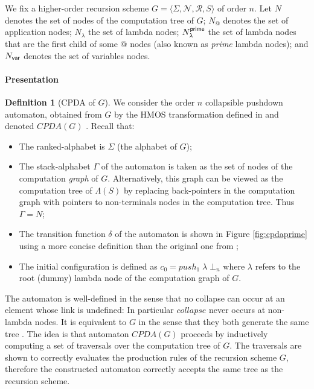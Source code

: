 \documentclass[a4paper]{article}[12pt]
\theoremstyle{remark}
\theoremstyle{definition}
\newtheorem{definition}{Definition}[section]
\newcommand\Nodes{N}%
\begin{document}
We fix a higher-order recursion scheme $G = \langle \Sigma, \mathcal{N}, \mathcal{R}, S \rangle$ of order $n$. Let $\Nodes$ denotes the set of nodes of the computation tree of $G$; $\Nodes_@$ denotes the set of application nodes; $\Nodes_\lambda$ the set of lambda nodes; $\Nodes_\lambda^{\sf prime}$ the set of lambda nodes that are the first child of some $@$ nodes (also known as \emph{prime} lambda nodes); and $\Nodes_{\sf var}$ denotes the set of variables nodes.

\paragraph{Presentation}

\begin{definition}[CPDA of $G$]
We consider the order $n$ collapsible pushdown automaton, obtained from $G$ by the HMOS transformation defined in \cite{hmos-lics08} and denoted $CPDA(G)$ \cite[Definition 5.2]{hague-collaps-full}. Recall that:
\begin{itemize}
	\item The ranked-alphabet is $\Sigma$ (the alphabet of $G$);
	\item The stack-alphabet $\Gamma$ of the automaton is taken as the set of nodes of the computation \emph{graph} of $G$. Alternatively, this graph can be viewed as the computation tree of $\Lambda(S)$ by replacing back-pointers in the computation graph with pointers to non-terminals nodes in the computation tree. Thus $\Gamma = \Nodes$;
	\item The transition function $\delta$ of the automaton is shown in Figure \ref{fig:cpdaprime} using a more concise definition than the original one
	from \cite{hague-collaps-full};
	\item The initial configuration is defined as $c_0 = push_1\; \lambda\; \bot_n$
	where $\lambda$ refers to the root (dummy) lambda node of the computation graph of $G$.	
\end{itemize} 
\end{definition}
The automaton is well-defined in the sense that no collapse can occur at an element whose link is undefined: In particular $collapse$ never occurs at non-lambda nodes. It is equivalent to $G$ in the sense that they both generate the same tree \cite{hmos-lics08}.
The idea is that automaton $CPDA(G)$ proceeds by inductively computing a set of traversals over the computation tree of $G$. The traversals are shown to correctly evaluates the production rules of the recursion scheme $G$, therefore the constructed automaton correctly accepts the same tree as the recursion scheme. 
\end{document}
